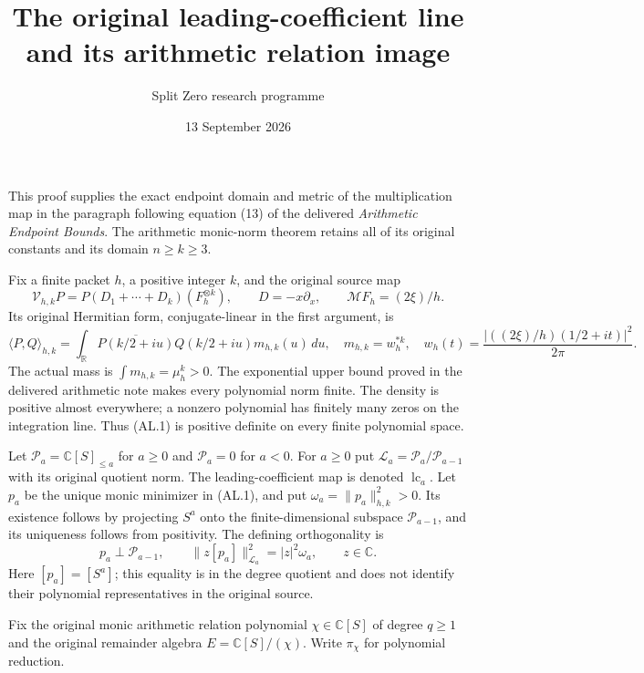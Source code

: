 \documentclass[11pt]{article}
\title{The original leading-coefficient line and its arithmetic relation image}
\author{Split Zero research programme}
\date{13 September 2026}
\newcommand{\calP}{\mathcal P}
\newcommand{\calL}{\mathcal L}
\begin{document}
\maketitle

This proof supplies the exact endpoint domain and metric of the multiplication
map in the paragraph following equation (13) of the delivered \emph{Arithmetic
Endpoint Bounds}. The arithmetic monic-norm theorem retains all of its original
constants and its domain $n\ge k\ge3$.

Fix a finite packet $h$, a positive integer $k$, and the original source map
\[
 \mathcal V_{h,k}P=P(D_1+\cdots+D_k)(F_h^{\otimes k}),\qquad
 D=-x\partial_x,\qquad \mathcal MF_h=(2\xi)/h.
\]
Its original Hermitian form, conjugate-linear in the first argument, is
\begin{equation}\tag{AL.1}
 \langle P,Q\rangle_{h,k}
 =\int_{\mathbb R}\overline{P(k/2+iu)}Q(k/2+iu)
    m_{h,k}(u)\,du,\quad
 m_{h,k}=w_h^{*k},\quad
 w_h(t)=\frac{|((2\xi)/h)(1/2+it)|^2}{2\pi}.
\end{equation}
The actual mass is $\int m_{h,k}=\mu_h^k>0$. The exponential upper bound
proved in the delivered arithmetic note makes every polynomial norm finite.
The density is positive almost everywhere; a nonzero polynomial has finitely
many zeros on the integration line. Thus (AL.1) is positive definite on every
finite polynomial space.

Let $\calP_a=\mathbb C[S]_{\le a}$ for $a\ge0$ and $\calP_a=0$ for $a<0$.
For $a\ge0$ put $\calL_a=\calP_a/\calP_{a-1}$ with its original quotient
norm. The leading-coefficient map is denoted $\operatorname{lc}_a$.
Let $p_a$ be the unique monic minimizer in (AL.1), and put
$\omega_a=\|p_a\|_{h,k}^2>0$. Its existence follows by projecting $S^a$
onto the finite-dimensional subspace $\calP_{a-1}$, and its uniqueness follows
from positivity. The defining orthogonality is
\begin{equation}\tag{AL.2}
 p_a\perp\calP_{a-1},\qquad
 \|z[p_a]\|_{\calL_a}^2=|z|^2\omega_a,\qquad z\in\mathbb C.
\end{equation}
Here $[p_a]=[S^a]$; this equality is in the degree quotient and does not identify
their polynomial representatives in the original source.

Fix the original monic arithmetic relation polynomial $\chi\in\mathbb C[S]$
of degree $q\ge1$ and the original remainder algebra
$E=\mathbb C[S]/(\chi)$. Write $\pi_\chi$ for polynomial reduction.
\end{document}

